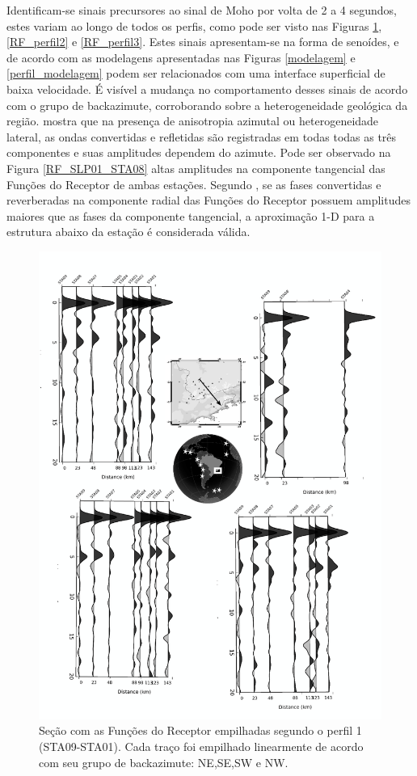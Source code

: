 Identificam-se sinais precursores ao sinal de Moho por volta de 2 a 4 segundos, estes variam ao longo de todos os perfis, como pode ser visto nas Figuras \ref{RF_perfil1}, \ref{RF_perfil2} e \ref{RF_perfil3}. Estes sinais apresentam-se na forma de senoídes, e de acordo com as modelagens apresentadas nas Figuras \ref{modelagem} e \ref{perfil_modelagem} podem ser relacionados com uma interface superficial de baixa velocidade. É visível a mudança no comportamento desses sinais de acordo com o grupo de backazimute, corroborando sobre a heterogeneidade geológica da região. \cite{vinnik_depth_2007} mostra que na presença de anisotropia azimutal ou heterogeneidade lateral, as ondas convertidas e refletidas são registradas em todas todas as três componentes e suas amplitudes dependem do azimute. Pode ser observado na Figura \ref{RF_SLP01_STA08} altas amplitudes na componente tangencial das Funções do Receptor de ambas estações. Segundo \cite{vinnik_depth_2007}, se as fases convertidas e reverberadas na componente radial das Funções do Receptor possuem amplitudes maiores que as fases da componente tangencial, a aproximação 1-D para a estrutura abaixo da estação é considerada válida.

\begin{figure}[!ht]
\centering
\includegraphics[scale=0.15]{Figs/RF_azimute_perfil1.png}
\caption{Seção com as Funções do Receptor empilhadas segundo o perfil 1 (STA09-STA01). Cada traço foi empilhado linearmente de acordo com seu grupo de backazimute: NE,SE,SW e NW.}
\label{RF_perfil1}
\end{figure}

